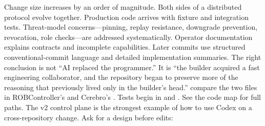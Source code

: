 Change size increases by an order of magnitude.\markdownRendererOlItemEnd 
{}Both sides of a distributed protocol evolve together.\markdownRendererOlItemEnd 
{}Production code arrives with fixture and integration tests.\markdownRendererOlItemEnd 
{}Threat-model concerns—pinning, replay resistance, downgrade prevention,\markdownRendererSoftLineBreak
{}revocation, role checks—are addressed systematically.\markdownRendererOlItemEnd 
{}Operator documentation explains contracts and incomplete capabilities.\markdownRendererOlItemEnd 
{}Later commits use structured conventional-commit language and detailed\markdownRendererSoftLineBreak
{}implementation summaries.\markdownRendererOlItemEnd 
\markdownRendererOlEnd \markdownRendererInterblockSeparator
{}The right conclusion is not “AI replaced the programmer.” It is “the builder\markdownRendererSoftLineBreak
{}acquired a fast engineering collaborator, and the repository began to preserve\markdownRendererSoftLineBreak
{}more of the reasoning that previously lived only in the builder's head.”\markdownRendererInterblockSeparator
{}\markdownRendererThematicBreak{}\markdownRendererInterblockSeparator
{}
\markdownRendererSectionEnd 
\markdownRendererSectionEnd \markdownRendererSectionBegin
{}\markdownRendererInterblockSeparator
{}\markdownRendererBlockQuoteBegin
{} compare the two  files in ROBController's  and Cerebro's . Tests begin in  and . See the code map for full paths.\markdownRendererBlockQuoteEnd \markdownRendererInterblockSeparator
{}The v2 control plane is the strongest example of how to use Codex on a\markdownRendererSoftLineBreak
{}cross-repository change.\markdownRendererInterblockSeparator
{}\markdownRendererSectionBegin
{}\markdownRendererInterblockSeparator
{}Ask for a design before edits:\markdownRendererInterblockSeparator
{}\markdownRendererInterblockSeparator
